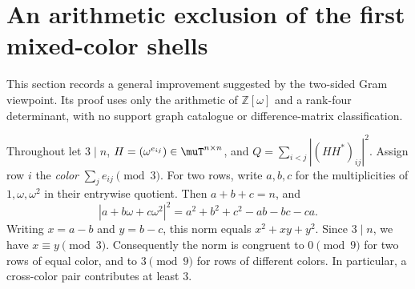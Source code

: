 \section{An arithmetic exclusion of the first mixed-color shells}
\label{sec:mixed-arithmetic-addendum}

This section records a general improvement suggested by the
two-sided Gram viewpoint. Its proof uses only the arithmetic of
\(\mathbb Z[\omega]\) and a rank-four determinant, with no support
graph catalogue or difference-matrix classification.

Throughout let \(3\mid n\), \(H=(\omega^{e_{ij}})\in\muT^{n\times n}\),
and \(Q=\sum_{i<j}|(HH^*)_{ij}|^2\). Assign row \(i\) the
\emph{color} \(\sum_j e_{ij}\pmod3\). For two rows, write
\(a,b,c\) for the multiplicities of \(1,\omega,\omega^2\) in
their entrywise quotient. Then \(a+b+c=n\), and
\[
 \left|a+b\omega+c\omega^2\right|^2
 =a^2+b^2+c^2-ab-bc-ca.
\]
Writing \(x=a-b\) and \(y=b-c\), this norm equals
\(x^2+xy+y^2\). Since \(3\mid n\), we have
\(x\equiv y\pmod3\). Consequently the norm is congruent to
\(0\pmod9\) for two rows of equal color, and to
\(3\pmod9\) for rows of different colors.
In particular, a cross-color pair contributes at least \(3\).

